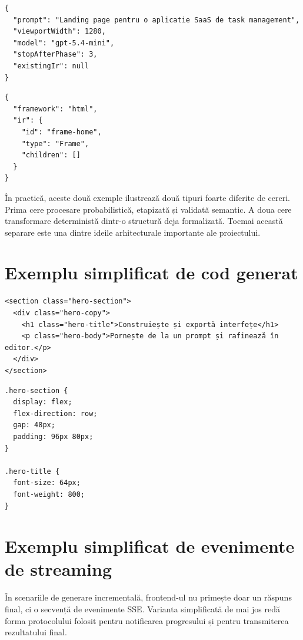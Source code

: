 \begin{lstlisting}[style=favigon,caption={Exemplu simplificat de request pentru pipeline-ul AI}]
{
  "prompt": "Landing page pentru o aplicatie SaaS de task management",
  "viewportWidth": 1280,
  "model": "gpt-5.4-mini",
  "stopAfterPhase": 3,
  "existingIr": null
}
\end{lstlisting}

\begin{lstlisting}[style=favigon,caption={Exemplu simplificat de request pentru generarea de cod}]
{
  "framework": "html",
  "ir": {
    "id": "frame-home",
    "type": "Frame",
    "children": []
  }
}
\end{lstlisting}

În practică, aceste două exemple ilustrează două tipuri foarte diferite de cereri. Prima cere procesare probabilistică, etapizată și validată semantic. A doua cere transformare deterministă dintr-o structură deja formalizată. Tocmai această separare este una dintre ideile arhitecturale importante ale proiectului.

\section{Exemplu simplificat de cod generat}

\begin{lstlisting}[style=favigon,caption={Exemplu scurt de HTML generat de convertor}]
<section class="hero-section">
  <div class="hero-copy">
    <h1 class="hero-title">Construiește și exportă interfețe</h1>
    <p class="hero-body">Pornește de la un prompt și rafinează în editor.</p>
  </div>
</section>
\end{lstlisting}

\begin{lstlisting}[style=favigon,caption={Exemplu scurt de CSS generat de convertor}]
.hero-section {
  display: flex;
  flex-direction: row;
  gap: 48px;
  padding: 96px 80px;
}

.hero-title {
  font-size: 64px;
  font-weight: 800;
}
\end{lstlisting}

\section{Exemplu simplificat de evenimente de streaming}

În scenariile de generare incrementală, frontend-ul nu primește doar un răspuns final, ci o secvență de evenimente SSE. Varianta simplificată de mai jos redă forma protocolului folosit pentru notificarea progresului și pentru transmiterea rezultatului final.

